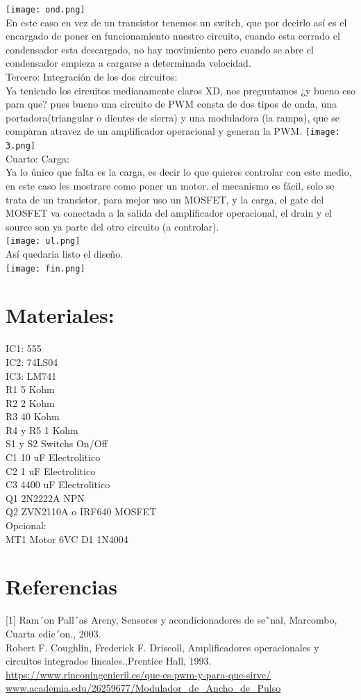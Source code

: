 \documentclass[10pt,a4paper]{article}
\begin{document}
\texttt{[image: ond.png]}\\
En este caso en vez de un transistor tenemos un switch, que por decirlo así es el encargado de poner en funcionamiento nuestro circuito, cuando esta cerrado el condensador esta descargado, no hay movimiento pero cuando se abre el condensador empieza a cargarse a determinada velocidad.\\
\bigskip
Tercero: Integración de los dos circuitos:\\
Ya teniendo los circuitos medianamente claros XD, nos preguntamos ¿y bueno eso para que? pues bueno una circuito de PWM consta de dos tipos de onda, una portadora(triangular o dientes de sierra) y una moduladora (la rampa), que se comparan atravez de un amplificador operacional y generan la PWM.
\texttt{[image: 3.png]}\\
\bigskip
Cuarto: Carga:\\
Ya lo único que falta es la carga, es decir lo que quieres controlar con este medio, en este caso les mostrare como poner un motor. el mecanismo es fácil, solo se trata de un transistor, para mejor uso un MOSFET, y la carga, el gate del MOSFET va conectada a la salida del amplificador operacional, el drain y el source son ya parte del otro circuito (a controlar).\\
\texttt{[image: ul.png]} \\
Así quedaria listo el diseño.\\
\texttt{[image: fin.png]} 
\section{Materiales:}
IC1: 555\\
IC2: 74LS04\\
IC3: LM741\\

R1 5 Kohm\\
R2 2 Kohm\\
R3 40 Kohm\\
R4 y R5 1 Kohm\\

S1 y S2 Switchs On/Off\\

C1 10 uF Electrolitico\\
C2 1 uF Electrolitico\\
C3 4400 uF Electrolitico\\

Q1 2N2222A NPN\\
Q2 ZVN2110A o IRF640 MOSFET\\
\bigskip
Opcional:\\
MT1 Motor 6VC
D1 1N4004\\
\section{Referencias}
[1] Ram´on Pall´as Areny, Sensores y acondicionadores de se˜nal, Marcombo, Cuarta edic´on., 2003.\\
\bigskip
[2] Robert F. Coughlin, Frederick F. Driscoll, Ampliﬁcadores operacionales y circuitos integrados lineales.,Prentice Hall, 1993.\\
\bigskip
\url{https://www.rinconingenieril.es/que-es-pwm-y-para-que-sirve/}
\url{www.academia.edu/26259677/Modulador_de_Ancho_de_Pulso}
\end{document}
